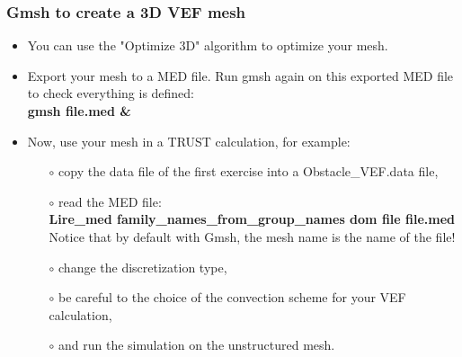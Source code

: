 \documentclass[10pt, hyperref={unicode=true,pdfusetitle, bookmarks=true,bookmarksnumbered=false,bookmarksopen=false, breaklinks=false,pdfborder={0 0 1},backref=true,colorlinks=true,linkcolor=darkblue,pageanchor}]{beamer}
\begin{document}
\begin{frame}
\frametitle{Gmsh to create a 3D VEF mesh}
\begin{block}{}

\begin{itemize}
\item You can use the "Optimize 3D" algorithm to optimize your mesh.

\item Export your mesh to a MED file. Run gmsh again on this exported MED file to check everything is defined:\\
\textbf{gmsh file.med \&}

\item Now, use your mesh in a TRUST calculation, for example:
        \begin{itemize}
        \item [$\circ$] copy the data file of the first exercise into a Obstacle\_VEF.data file, \\
        \item [$\circ$] read the MED file:\\
                        \textbf{Lire\_med family\_names\_from\_group\_names dom file file.med } \\
                        Notice that by default with Gmsh, the mesh name is the name of the file!
        \item [$\circ$] change the discretization type,
        \item [$\circ$] be careful to the choice of the convection scheme for your VEF calculation,
        \item [$\circ$] and run the simulation on the unstructured mesh.
        \end{itemize}
\end{itemize}

\end{block}
\end{frame}
\end{document}
